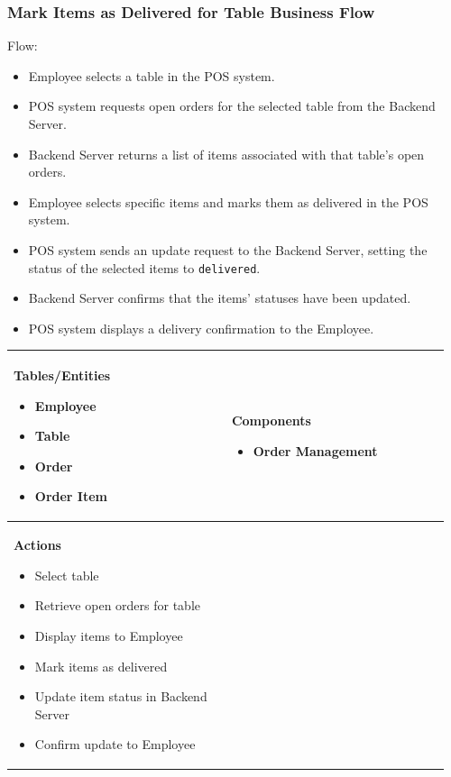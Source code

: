 \documentclass[]{VUMIFTemplateClass}
\newenvironment{mpitemlist}[1][\linewidth]{%
    \begin{minipage}[t]{#1}%
        \setlength{\leftmargini}{12pt}%
        \begin{itemize}%
            \setlength{\itemsep}{1pt}%
            \setlength{\parskip}{0pt}%
            \setlength{\parsep}{0pt}%
}{%
        \end{itemize}%
    \end{minipage}\newline
}
\begin{document}
\subsubsection{Mark Items as Delivered for Table Business Flow}

Flow:
\begin{itemize}
\setlength{\itemsep}{2pt}
\setlength{\parskip}{0pt}
\setlength{\parsep}{0pt}
\item Employee selects a table in the POS system.
\item POS system requests open orders for the selected table from the Backend Server.
\item Backend Server returns a list of items associated with that table’s open orders.
\item Employee selects specific items and marks them as delivered in the POS system.
\item POS system sends an update request to the Backend Server, setting the status of the selected items to \texttt{delivered}.
\item Backend Server confirms that the items’ statuses have been updated.
\item POS system displays a delivery confirmation to the Employee.
\end{itemize}

\begin{center}
\setlength{\tabcolsep}{8pt}
\begin{tabular}{|p{0.48\linewidth}|p{0.48\linewidth}|}
\hline
\textbf{Tables/Entities} \newline
\begin{mpitemlist}
\item Employee
\item Table
\item Order
\item Order Item
\end{mpitemlist}
&
\textbf{Components} \newline
\begin{mpitemlist}
\item Order Management
\end{mpitemlist}
\\ \hline
\textbf{Actions} \newline
\begin{mpitemlist}
\item Select table
\item Retrieve open orders for table
\item Display items to Employee
\item Mark items as delivered
\item Update item status in Backend Server
\item Confirm update to Employee
\end{mpitemlist}
&

\\ \hline
\end{tabular}
\end{center}
\end{document}
